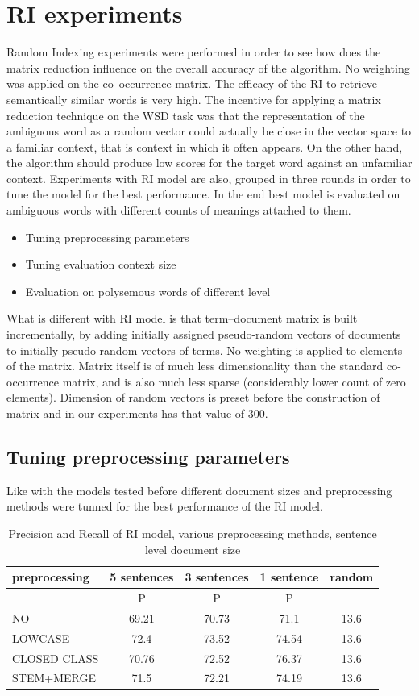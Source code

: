 \section{RI experiments} 
Random Indexing experiments were performed in order to see how does the matrix reduction influence on the overall accuracy of the algorithm. No weighting was applied on the co--occurrence matrix. The efficacy of the RI to retrieve semantically similar words is very high. 
 The incentive for applying a matrix reduction technique on the WSD task was that the representation of the ambiguous word as a random vector could actually be close in the vector space to a familiar context, that is context in which it often appears. On the other hand, the algorithm should produce low scores for the target word against an unfamiliar context. 
Experiments  with RI model are also, grouped in three rounds in order to tune
the model for the best performance. In the end best model is evaluated on ambiguous words with 
different counts of meanings attached to them.
\begin{itemize}
\item Tuning preprocessing parameters
\item Tuning evaluation context size
\item Evaluation on polysemous words of different level
\end{itemize}

What is different with RI model is that term--document matrix is built incrementally, by adding initially 
assigned pseudo-random vectors of documents to initially pseudo-random vectors of terms. No 
weighting is applied to elements of the matrix. Matrix itself is of much less dimensionality than the 
standard co-occurrence matrix, and is also much less sparse (considerably lower count of zero 
elements). 
 Dimension of random vectors is preset before the construction of matrix and in our 
experiments has that value of 300.

\subsection{Tuning preprocessing parameters}
Like with the models tested before different document sizes and preprocessing methods were tunned
for the best performance of the RI model. 

\begin{table}[h!]
\begin{tabular}{ l | c  | c |c | c}
   preprocessing &  5 sentences & 3 sentences & 1 sentence  & random\\
\hline
	& P  &  P  &  P  &  \\
\hline\hline
 NO  & 69.21  & 70.73  &71.1 & 13.6 \\
LOWCASE  &72.4 & 73.52 & 74.54 &13.6   \\
CLOSED CLASS &70.76 & 72.52 & 76.37 &13.6   \\
STEM+MERGE & 71.5 & 72.21 & 74.19 & 13.6   \\
\end{tabular}
\caption{Precision and Recall of RI model, various preprocessing methods, sentence level document size}
\end{table}

